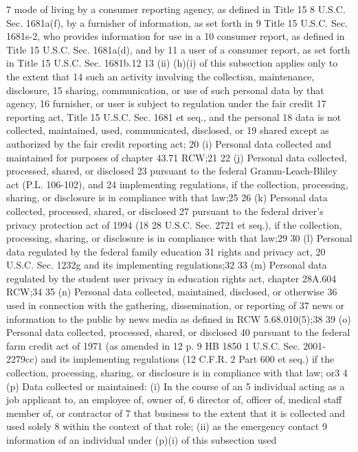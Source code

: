 7 mode of living by a consumer reporting agency, as defined in Title 15
8 U.S.C. Sec. 1681a(f), by a furnisher of information, as set forth in
9 Title 15 U.S.C. Sec. 1681s-2, who provides information for use in a
10 consumer report, as defined in Title 15 U.S.C. Sec. 1681a(d), and by
11 a user of a consumer report, as set forth in Title 15 U.S.C. Sec.
1681b.12
13 (ii) (h)(i) of this subsection applies only to the extent that
14 such an activity involving the collection, maintenance, disclosure,
15 sharing, communication, or use of such personal data by that agency,
16 furnisher, or user is subject to regulation under the fair credit
17 reporting act, Title 15 U.S.C. Sec. 1681 et seq., and the personal
18 data is not collected, maintained, used, communicated, disclosed, or
19 shared except as authorized by the fair credit reporting act;
20 (i) Personal data collected and maintained for purposes of
chapter 43.71 RCW;21
22 (j) Personal data collected, processed, shared, or disclosed
23 pursuant to the federal Gramm-Leach-Bliley act (P.L. 106-102), and
24 implementing regulations, if the collection, processing, sharing, or
disclosure is in compliance with that law;25
26 (k) Personal data collected, processed, shared, or disclosed
27 pursuant to the federal driver's privacy protection act of 1994 (18
28 U.S.C. Sec. 2721 et seq.), if the collection, processing, sharing, or
disclosure is in compliance with that law;29
30 (l) Personal data regulated by the federal family education
31 rights and privacy act, 20 U.S.C. Sec. 1232g and its implementing
regulations;32
33 (m) Personal data regulated by the student user privacy in
education rights act, chapter 28A.604 RCW;34
35 (n) Personal data collected, maintained, disclosed, or otherwise
36 used in connection with the gathering, dissemination, or reporting of
37 news or information to the public by news media as defined in RCW
5.68.010(5);38
39 (o) Personal data collected, processed, shared, or disclosed
40 pursuant to the federal farm credit act of 1971 (as amended in 12
p. 9 HB 1850
1 U.S.C. Sec. 2001-2279cc) and its implementing regulations (12 C.F.R.
2 Part 600 et seq.) if the collection, processing, sharing, or
disclosure is in compliance with that law; or3
4 (p) Data collected or maintained: (i) In the course of an
5 individual acting as a job applicant to, an employee of, owner of,
6 director of, officer of, medical staff member of, or contractor of
7 that business to the extent that it is collected and used solely
8 within the context of that role; (ii) as the emergency contact
9 information of an individual under (p)(i) of this subsection used
